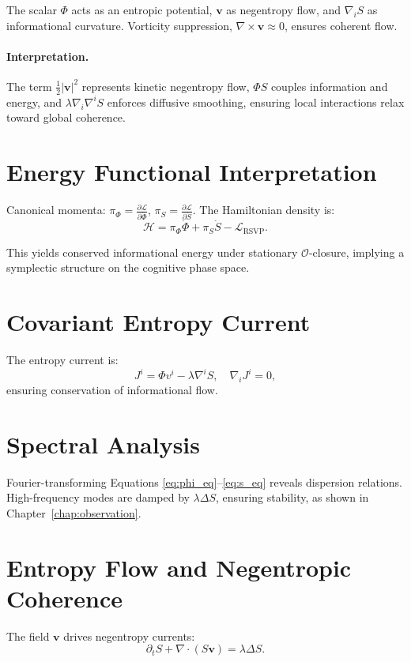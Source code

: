 \documentclass[12pt]{book}
\theoremstyle{definition}
\begin{document}
The scalar \(\Phi\) acts as an entropic potential, \(\mathbf{v}\) as negentropy flow, and \(\nabla_i S\) as informational curvature. Vorticity suppression, \(\nabla \times \mathbf{v} \approx 0\), ensures coherent flow.

\paragraph{Interpretation.} The term \(\frac{1}{2}|\mathbf{v}|^2\) represents kinetic negentropy flow, \(\Phi S\) couples information and energy, and \(\lambda \nabla_i \nabla^i S\) enforces diffusive smoothing, ensuring local interactions relax toward global coherence.

\section{Energy Functional Interpretation}
Canonical momenta: \(\pi_\Phi = \frac{\partial \mathcal{L}}{\partial \dot{\Phi}}\), \(\pi_S = \frac{\partial \mathcal{L}}{\partial \dot{S}}\). The Hamiltonian density is:
\begin{equation}
\mathcal{H} = \pi_\Phi \dot{\Phi} + \pi_S \dot{S} - \mathcal{L}_{\text{RSVP}}.
\end{equation}

This yields conserved informational energy under stationary \(\mathcal{O}\)-closure, implying a symplectic structure on the cognitive phase space.

\section{Covariant Entropy Current}
The entropy current is:
\begin{equation}
J^i = \Phi v^i - \lambda \nabla^i S, \quad \nabla_i J^i = 0,
\end{equation}
ensuring conservation of informational flow.

\section{Spectral Analysis}
Fourier-transforming Equations \eqref{eq:phi_eq}–\eqref{eq:s_eq} reveals dispersion relations. High-frequency modes are damped by \(\lambda \Delta S\), ensuring stability, as shown in Chapter~\ref{chap:observation}.

\section{Entropy Flow and Negentropic Coherence}
The field \(\mathbf{v}\) drives negentropy currents:
\begin{equation}
\partial_t S + \nabla \cdot (S \mathbf{v}) = \lambda \Delta S.
\end{equation}
\end{document}

